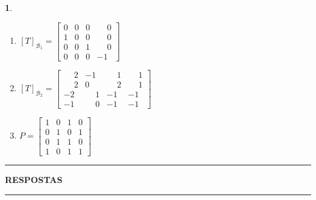 \documentclass[12pt]{exam}
\newtheorem{exercicio}{}
\begin{document}
\begin{exercicio}
\begin{enumerate}[label=({\alph*})]
    \end{enumerate}
    \begin{solucao}
      \begin{enumerate}[label=({\alph*})]
        \item $[T]_{\mathcal{B}_1} = \begin{bmatrix}
          0 & 0 & 0 & \phantom{-}0\\
          1 & 0 & 0 & \phantom{-}0\\
          0 & 0 & 1 & \phantom{-}0\\
          0 & 0 & 0 & -1
        \end{bmatrix}$

        \item $[T]_{\mathcal{B}_2} = \begin{bmatrix}
          \phantom{-}2 & -1 & \phantom{-}1 & \phantom{-}1\\
          \phantom{-}2 & 0 & \phantom{-}2 & \phantom{-}1\\
          -2 & \phantom{-}1 & -1 & -1\\
          -1 & \phantom{-}0 & -1 & -1
        \end{bmatrix}$

        \item $P = \begin{bmatrix}
          1 & 0 & 1 & 0\\
          0 & 1 & 0 & 1\\
          0 & 1 & 1 & 0\\
          1 & 0 & 1 & 1
        \end{bmatrix}$
      \end{enumerate}
    \end{solucao}
\end{exercicio}

\newpage
{}
\hrule
\begin{center}
{\large\bf RESPOSTAS}
\end{center}
\hrule

\end{document}
